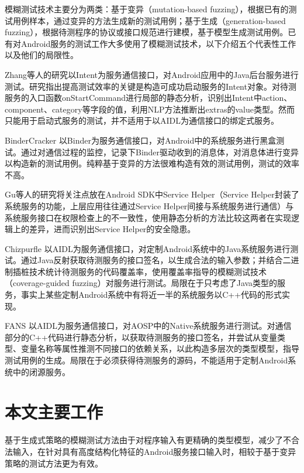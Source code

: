 \documentclass[winfonts,master,twoside]{njuthesis}
\begin{document}
模糊测试技术主要分为两类\cite{li2018fuzzing}：基于变异（mutation-based fuzzing），根据已有的测试用例样本，通过变异的方法生成新的测试用例；基于生成（generation-based fuzzing），根据待测程序的协议或接口规范进行建模，基于模型生成测试用例。已有对Android服务的测试工作大多使用了模糊测试技术，以下介绍五个代表性工作以及他们的局限性。

Zhang等人的研究\cite{zhang2017systematically}以Intent为服务通信接口，对Android应用中的Java后台服务进行测试。研究指出提高测试效率的关键是构造可成功启动服务的Intent对象。对待测服务的入口函数onStartCommand进行局部的静态分析，识别出Intent中action、component、category等字段的值，利用NLP方法推断出extras的value类型。然而只能用于启动式服务的测试，并不适用于以AIDL为通信接口\cite{service}的绑定式服务。

BinderCracker \cite{feng2016understanding}以Binder为服务通信接口，对Android中的系统服务进行黑盒测试。通过对通信过程的监控，记录下Binder驱动收到的消息体，对消息体进行变异以构造新的测试用例。纯粹基于变异的方法很难构造有效的测试用例，测试的效率不高。

Gu等人的研究\cite{gu2016exploiting}将关注点放在Android SDK中Service Helper（Service Helper封装了系统服务的功能，上层应用往往通过Service Helper间接与系统服务进行通信）与系统服务接口在权限检查上的不一致性，使用静态分析的方法比较这两者在实现逻辑上的差异，进而识别出Service Helper的安全隐患。

Chizpurfle \cite{iannillo2017chizpurfle}以AIDL为服务通信接口，对定制Android系统中的Java系统服务进行测试。通过Java反射获取待测服务的接口签名，以生成合法的输入参数；并结合二进制插桩技术统计待测服务的代码覆盖率，使用覆盖率指导的模糊测试技术（coverage-guided fuzzing）对服务进行测试。局限在于只考虑了Java类型的服务，事实上某些定制Android系统中有将近一半的系统服务以C++代码的形式实现。


FANS \cite{liu2020fans}以AIDL为服务通信接口，对AOSP中的Native系统服务进行测试。对通信部分的C++代码进行静态分析，以获取待测服务的接口签名，并尝试从变量类型、变量名称等属性推测不同接口的依赖关系，以此构造多层次的类型模型，指导测试用例的生成。局限在于必须获得待测服务的源码，不能适用于定制Android系统中的闭源服务。


\section{本文主要工作}

基于生成式策略的模糊测试方法由于对程序输入有更精确的类型模型，减少了不合法输入，在针对具有高度结构化特征的Android服务接口输入时，相较于基于变异策略的测试方法更为有效。
\end{document}
